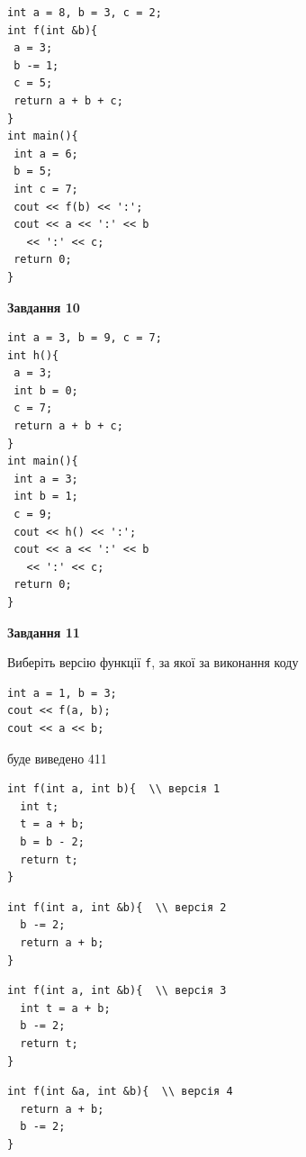 \documentclass[12pt, ukrainian]{article}
\def\code#1{\Verb!#1!}
\begin{document}
{\begin {large}
\begin{minipage}[t]{7.0cm}
\begin{verbatim}
int a = 8, b = 3, c = 2;
int f(int &b){
 a = 3;
 b -= 1;
 c = 5;
 return a + b + c;
}
int main(){
 int a = 6;
 b = 5;
 int c = 7;
 cout << f(b) << ':';
 cout << a << ':' << b 
   << ':' << c;
 return 0;
}
\end{verbatim}



\begin{center}
\textbf{Завдання 10}
\end{center}
\vspace{-8mm}

\begin{verbatim}
int a = 3, b = 9, c = 7;
int h(){
 a = 3;
 int b = 0;
 c = 7;
 return a + b + c;
}
int main(){
 int a = 3;
 int b = 1;
 c = 9;
 cout << h() << ':';
 cout << a << ':' << b 
   << ':' << c;
 return 0;
}
\end{verbatim}

\end{minipage}
\vline \hspace{1mm}
\begin{minipage}[t]{11.0cm}

\begin{center}
\textbf{Завдання 11}
\end{center}
Виберіть версію функції \code{f}, за якої за виконання коду
\begin{verbatim}
int a = 1, b = 3;
cout << f(a, b);
cout << a << b;
\end{verbatim}

буде виведено 411

\begin{verbatim}
int f(int a, int b){  \\ версія 1
  int t;
  t = a + b;
  b = b - 2;
  return t;
}
\end{verbatim}

\vspace{-8mm}\begin{verbatim}
int f(int a, int &b){  \\ версія 2
  b -= 2;
  return a + b;
}
\end{verbatim}

\vspace{-8mm}\begin{verbatim}
int f(int a, int &b){  \\ версія 3
  int t = a + b;
  b -= 2;
  return t;
}
\end{verbatim}

\vspace{-8mm}\begin{verbatim}
int f(int &a, int &b){  \\ версія 4
  return a + b;
  b -= 2;
}
\end{verbatim}




\end{minipage}
\end{large}}
\end{document}
